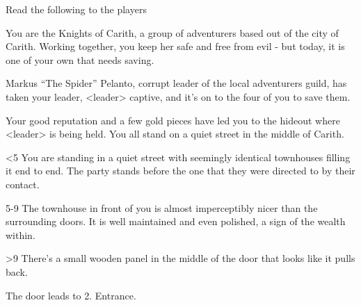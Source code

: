 

Read the following to the players

\begin{DndReadAloud}
You are the Knights of Carith, a group of adventurers based out of the city of Carith. Working together, you keep her safe and free from evil - but today, it is one of your own that needs saving.

Markus “The Spider” Pelanto, corrupt leader of the local adventurers guild, has taken your leader, <leader> captive, and it’s on to the four of you to save them.

Your good reputation and a few gold pieces have led you to the hideout where <leader> is being held. You all stand on a quiet street in the middle of Carith.
\end{DndReadAloud}

<5 You are standing in a quiet street with seemingly identical townhouses filling it end to end. The party stands before the one that they were directed to by their contact.

5-9 The townhouse in front of you is almost imperceptibly nicer than the surrounding doors. It is well maintained and even polished, a sign of the wealth within.

>9 There’s a small wooden panel in the middle of the door that looks like it pulls back.

The door leads to 2. Entrance.






